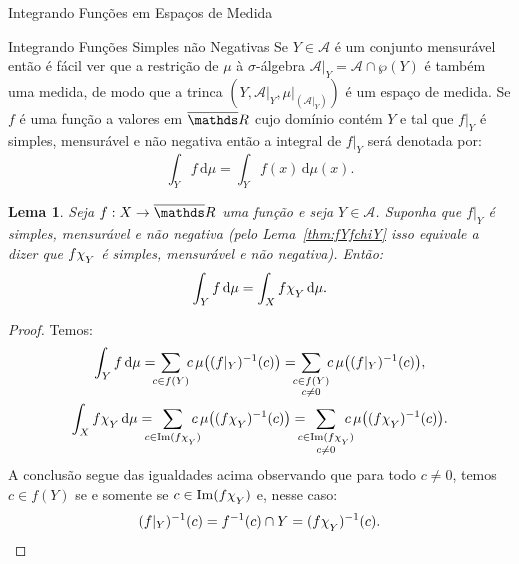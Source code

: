 \documentclass[oneside,final,11pt]{amsbook}
\newcommand{\R}{\mathds R}
\newcommand{\Img}{\mathrm{Im}}
\newcommand{\dd}{\mathrm d}
\newcommand{\chilow}[1]{\chi_{\lower2pt\hbox{$\scriptstyle#1$}}}
\newcommand{\subchilow}[1]{\chi_{\lower2pt\hbox{$\scriptscriptstyle#1$}}}
\theoremstyle{remark}\newtheorem{exercise}{Exercício}[chapter]
\theoremstyle{remark}\newtheorem{*exercise}[exercise]{\hbox to 0pt{\hskip 0pt minus 1fil*}Exercício}
\theoremstyle{definition}\newtheorem{exdefin}{Definição}[chapter]
\theoremstyle{plain}\newtheorem{teo}{Teorema}[section]
\theoremstyle{plain}\newtheorem{lem}[teo]{Lema}
\theoremstyle{plain}\newtheorem{prop}[teo]{Proposição}
\theoremstyle{plain}\newtheorem{cor}[teo]{Corolário}
\theoremstyle{definition}\newtheorem{defin}[teo]{Definição}
\theoremstyle{remark}\newtheorem{rem}[teo]{Observação}
\theoremstyle{definition}\newtheorem{notation}[teo]{Notação}
\theoremstyle{definition}\newtheorem{convention}[teo]{Convenção}
\theoremstyle{definition}\newtheorem{example}[teo]{Exemplo}
\numberwithin{section}{chapter}
\numberwithin{equation}{section}
\begin{document}
\begin{chapter}{Integrando Funções em Espaços de Medida}
\begin{section}{Integrando Funções Simples não Negativas}
Se $Y\in\mathcal A$ é um conjunto mensurável então é fácil ver que a restrição de $\mu$ à $\sigma$-álgebra
$\mathcal A\vert_Y=\mathcal A\cap\wp(Y)$ é também uma medida, de modo que a trinca
$(Y,\mathcal A\vert_Y,\mu\vert_{(\mathcal A\vert_Y)})$ é um espaço de medida. Se $f$
é uma função a valores em $\overline\R$ cujo domínio contém $Y$ e tal que
$f\vert_Y$ é simples, mensurável e não negativa então
a integral de $f\vert_Y$ será denotada por:
\[\int_Yf\,\dd\mu=\int_Yf(x)\,\dd\mu(x).\]
\begin{lem}\label{thm:intsubsimples}
Seja $f:X\to\overline\R$ uma função e seja $Y\in\mathcal A$. Suponha que
$f\vert_Y$ é simples, mensurável e não negativa (pelo Lema~\ref{thm:fYfchiY} isso equivale a dizer
que $f\chilow Y$ é simples, mensurável e não negativa). Então:
\[\int_Yf\,\dd\mu=\int_Xf\chilow Y\,\dd\mu.\]
\end{lem}
\begin{proof}
Temos:
\begin{gather*}
\int_Yf\,\dd\mu=\!\!\!\sum_{c\in f(Y)}\!\!c\,\mu\big((f\vert_Y)^{-1}(c)\big)=\!\!\!
\sum_{\substack{c\in f(Y)\\c\ne0}}\!\!c\,\mu\big((f\vert_Y)^{-1}(c)\big),\\
\int_Xf\chilow Y\,\dd\mu=\!\!\!\!\!\sum_{c\in\Img(f\subchilow Y)}\!\!\!\!\!c\,\mu\big((f\chilow Y)^{-1}(c)\big)
=\!\!\!\!\!\sum_{\substack{c\in\Img(f\subchilow Y)\\c\ne0}}\!\!\!\!\!c\,\mu\big((f\chilow Y)^{-1}(c)\big).
\end{gather*}
A conclusão segue das igualdades acima observando que para todo $c\ne0$, temos
$c\in f(Y)$ se e somente se $c\in\Img(f\chilow Y)$ e, nesse caso:
\[(f\vert_Y)^{-1}(c)=f^{-1}(c)\cap Y=(f\chilow Y)^{-1}(c).\qedhere\]
\end{proof}


\end{section}
\end{chapter}
\end{document}
